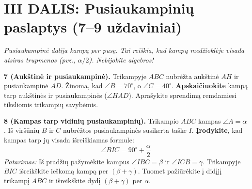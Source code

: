\documentclass[11pt,a4paper]{scrartcl}
\begin{document}
\section*{III DALIS: Pusiaukampinių paslaptys (7–9 uždaviniai)}
\textit{Pusiaukampinė dalija kampą per pusę. Tai reiškia, kad kampų medžioklėje visada atsiras trupmenos (pvz., \(\alpha/2\)). Nebijokite algebros!}

\textbf{7 (Aukštinė ir pusiaukampinė).} Trikampyje \(ABC\) nubrėžta aukštinė \(AH\) ir pusiaukampinė \(AD\). Žinoma, kad \(\angle B = 70^\circ\), o \(\angle C = 40^\circ\). \textbf{Apskaičiuokite} kampą tarp aukštinės ir pusiaukampinės (\(\angle HAD\)). Aprašykite sprendimą remdamiesi tiksliomis trikampių savybėmis.

\vspace{0.5cm}

\textbf{8 (Kampas tarp vidinių pusiaukampinių).} Trikampio \(ABC\) kampas \(\angle A = \alpha\). Iš viršūnių \(B\) ir \(C\) nubrėžtos pusiaukampinės susikerta taške \(I\). \textbf{Įrodykite}, kad kampas tarp jų visada išreiškiamas formule:
\begin{equation*}
\angle BIC = 90^\circ + \frac{\alpha}{2}
\end{equation*}
\textit{Patarimas:} Iš pradžių pažymėkite kampus \(\angle IBC = \beta\) ir \(\angle ICB = \gamma\). Trikampyje \(BIC\) išreikškite ieškomą kampą per \((\beta + \gamma)\). Tuomet pažiūrėkite į didįjį trikampį \(ABC\) ir išreikškite dydį \((\beta + \gamma)\) per \(\alpha\).

\begin{center}
\end{center}
\end{document}
